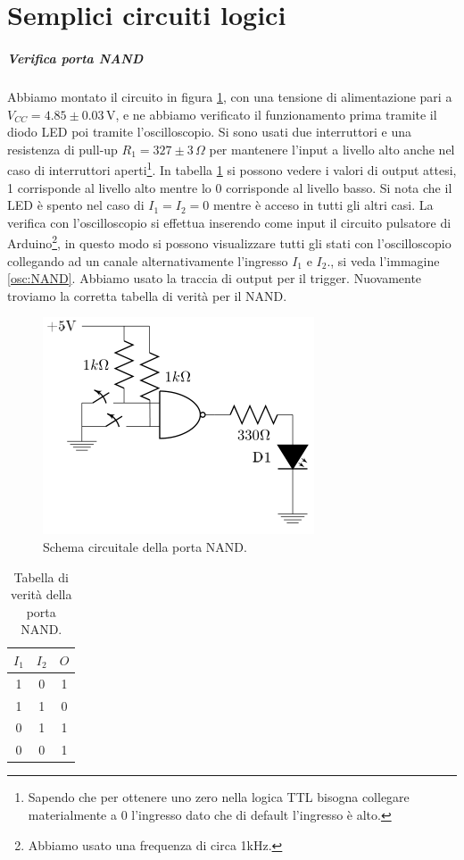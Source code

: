 \documentclass[10pt,a4paper]{article}
\begin{document}
\section{Semplici circuiti logici}
\subparagraph{Verifica porta NAND}
Abbiamo montato il circuito in figura \ref{fig:NAND}, con una tensione di alimentazione pari a $V_{CC}= 4.85\pm0.03\,\text{V}$, e ne abbiamo verificato il funzionamento prima tramite il diodo LED poi tramite l'oscilloscopio. Si sono usati due interruttori e una resistenza di pull-up $R_1=327\pm3\,\Omega$ per mantenere l'input a livello alto anche nel caso di interruttori aperti\footnote{Sapendo che per ottenere uno zero nella logica TTL bisogna collegare materialmente a 0 l'ingresso dato che di default l'ingresso è alto.}. In tabella \ref{tab:NAND} si possono vedere i valori di output attesi, 1 corrisponde al livello alto mentre lo 0 corrisponde al livello basso. Si nota che il LED è spento nel caso di $I_1=I_2=0$ mentre è acceso in tutti gli altri casi. La verifica con l'oscilloscopio si effettua inserendo come input il circuito pulsatore di Arduino\footnote{Abbiamo usato una frequenza di circa 1kHz.}, in questo modo si possono visualizzare tutti gli stati con l'oscilloscopio collegando ad un canale alternativamente l'ingresso $I_1$ e $I_2$., si veda l'immagine \ref{osc:NAND}. Abbiamo usato la traccia di output per il trigger. Nuovamente troviamo la corretta tabella di verità per il NAND.\\


\begin{figure}[!htb]
  \centering
  \includegraphics[scale=0.5]{NAND.png}
\caption{Schema circuitale della porta NAND.\label{fig:NAND}}
\end{figure}

\begin{table}[!htb]
\centering
\begin{tabular}{|c|c|c|}
\hline 
$I_1$ & $I_2$ & $O$ \\
\hline
 1 &  0 & 1\\ 
 
 1 &  1 & 0\\ 

 0 &  1 & 1\\ 
 
 0 &  0 & 1\\ 
\hline 
\end{tabular} 
\caption{Tabella di verità della porta NAND.\label{tab:NAND}}
\end{table}
\end{document}
